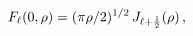 \[\mathop{F_{\ell}\/}\nolimits\!\left(0,\rho\right)=(\pi\rho/2)^{1/2}\mathop{J_{%
\ell+\frac{1}{2}}\/}\nolimits\!\left(\rho\right),\]